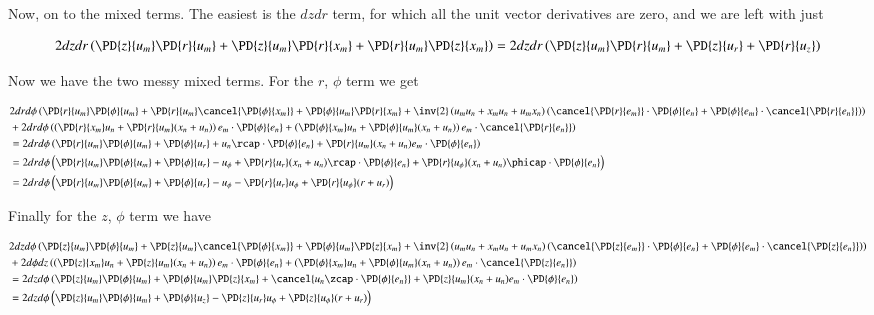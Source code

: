 Now, on to the mixed terms.  The easiest is the $dz dr$ term, for which all the unit vector derivatives are zero, and we are left with just

\begin{align*}
2 dz dr 
\left( 
\PD{z}{u_m} 
\PD{r}{u_m} 
+
\PD{z}{u_m} 
\PD{r}{x_m} 
+
\PD{r}{u_m} 
\PD{z}{x_m} 
\right)
=
2 dz dr 
\left( 
\PD{z}{u_m} 
\PD{r}{u_m} 
+
\PD{z}{u_r} 
+
\PD{r}{u_z} 
\right)
\end{align*}

Now we have the two messy mixed terms.  For the $r$, $\phi$ term we get

\begin{align*}
&2 dr 
d\phi 
\left( 
\PD{r}{u_m} 
\PD{\phi}{u_m} 
+
\PD{r}{u_m} 
\cancel{\PD{\phi}{x_m}}
+
\PD{\phi}{u_m} 
\PD{r}{x_m} 
+ 
\inv{2}
\left(
u_m u_n 
+
x_m u_n 
+
u_m x_n 
\right)
\left(
\cancel{\PD{r}{e_m}}
\cdot
\PD{\phi}{e_n} 
+
\PD{\phi}{e_m}
\cdot
\cancel{\PD{r}{e_n} }
\right) 
\right) 
\\
&+
2 dr d\phi 
\left( 
\left(
\PD{r}{x_m}
u_n
+
\PD{r}{u_m}(
x_n
+
u_n
)
\right)
e_m \cdot 
\PD{\phi}{e_n}
+
\left(
\PD{\phi}{x_m}
u_n
+
\PD{\phi}{u_m}(
x_n
+
u_n
)
\right)
e_m \cdot 
\cancel{\PD{r}{e_n}}
\right) \\
&=2 dr d\phi 
\left( 
\PD{r}{u_m} 
\PD{\phi}{u_m} 
+
\PD{\phi}{u_r} 
+
u_n
\rcap \cdot 
\PD{\phi}{e_n}
+
\PD{r}{u_m}(
x_n
+
u_n
)
e_m \cdot 
\PD{\phi}{e_n}
\right) \\
&=2 dr d\phi 
\left( 
\PD{r}{u_m} 
\PD{\phi}{u_m} 
+
\PD{\phi}{u_r} 
-
u_\phi
+
\PD{r}{u_r}(
x_n
+
u_n
)
\rcap \cdot 
\PD{\phi}{e_n}
+
\PD{r}{u_\phi}(
x_n
+
u_n
)
\phicap \cdot 
\PD{\phi}{e_n}
\right) \\
&=2 dr d\phi 
\left( 
\PD{r}{u_m} 
\PD{\phi}{u_m} 
+
\PD{\phi}{u_r} 
-
u_\phi
-
\PD{r}{u_r}
u_\phi
+
\PD{r}{u_\phi}(
r 
+
u_r
)
\right) \\
\end{align*}

Finally for the $z$, $\phi$ term we have

\begin{align*}
&2 dz 
d\phi 
\left( 
\PD{z}{u_m} 
\PD{\phi}{u_m} 
+
\PD{z}{u_m} 
\cancel{\PD{\phi}{x_m} }
+
\PD{\phi}{u_m} 
\PD{z}{x_m} 
+ 
\inv{2}
\left(
u_m u_n 
+
x_m u_n 
+
u_m x_n 
\right)
\left(
\cancel{\PD{z}{e_m}}
\cdot
\PD{\phi}{e_n} 
+
\PD{\phi}{e_m}
\cdot
\cancel{\PD{z}{e_n} }
\right) 
\right) 
\\
&+
2 d\phi dz 
\left( 
\left(
\PD{z}{x_m}
u_n
+
\PD{z}{u_m}(
x_n
+
u_n
)
\right)
e_m \cdot 
\PD{\phi}{e_n}
+
\left(
\PD{\phi}{x_m}
u_n
+
\PD{\phi}{u_m}(
x_n
+
u_n
)
\right)
e_m \cdot 
\cancel{\PD{z}{e_n}}
\right) \\
&=2 dz 
d\phi 
\left( 
\PD{z}{u_m} 
\PD{\phi}{u_m} 
+
\PD{\phi}{u_m} 
\PD{z}{x_m} 
+
\cancel{
u_n
\zcap \cdot 
\PD{\phi}{e_n}
}
+
\PD{z}{u_m}(
x_n
+
u_n
)
e_m \cdot 
\PD{\phi}{e_n}
\right) 
\\
&=2 dz 
d\phi 
\left( 
\PD{z}{u_m} 
\PD{\phi}{u_m} 
+
\PD{\phi}{u_z} 
-
\PD{z}{u_r}
u_\phi
+
\PD{z}{u_\phi}(
r
+
u_r
)
\right) 
\\
\end{align*}

